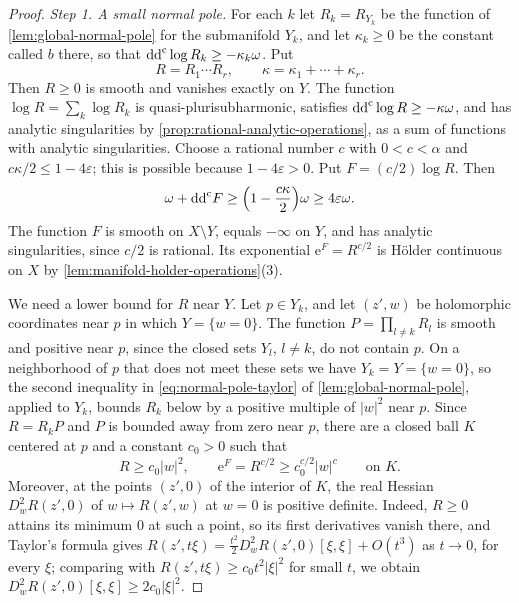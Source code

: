 \begin{proof}
\emph{Step 1. A small normal pole.} For each $k$ let $R_k=R_{Y_k}$ be the function of \cref{lem:global-normal-pole} for the submanifold $Y_k$, and let $\kappa_k\geq0$ be the constant called $b$ there, so that $\mathrm{dd}^{\mathrm{c}}\log R_k\geq-\kappa_k\omega$. Put
\[
 R=R_1\cdots R_r,\qquad\kappa=\kappa_1+\cdots+\kappa_r.
\]
Then $R\geq0$ is smooth and vanishes exactly on $Y$. The function $\log R=\sum_k\log R_k$ is quasi-plurisubharmonic, satisfies $\mathrm{dd}^{\mathrm{c}}\log R\geq-\kappa\omega$, and has analytic singularities by \cref{prop:rational-analytic-operations}, as a sum of functions with analytic singularities. Choose a rational number $c$ with $0<c<\alpha$ and $c\kappa/2\leq1-4\varepsilon$; this is possible because $1-4\varepsilon>0$. Put $F=(c/2)\log R$. Then
\[
 \omega+\mathrm{dd}^{\mathrm{c}} F\geq\Bigl(1-\frac{c\kappa}2\Bigr)\omega\geq4\varepsilon\omega.
\]
The function $F$ is smooth on $X\setminus Y$, equals $-\infty$ on $Y$, and has analytic singularities, since $c/2$ is rational. Its exponential $\mathrm e^F=R^{c/2}$ is H\"older continuous on $X$ by \cref{lem:manifold-holder-operations}(3).

We need a lower bound for $R$ near $Y$. Let $p\in Y_k$, and let $(z',w)$ be holomorphic coordinates near $p$ in which $Y=\{w=0\}$. The function $P=\prod_{l\neq k}R_l$ is smooth and positive near $p$, since the closed sets $Y_l$, $l\neq k$, do not contain $p$. On a neighborhood of $p$ that does not meet these sets we have $Y_k=Y=\{w=0\}$, so the second inequality in \eqref{eq:normal-pole-taylor} of \cref{lem:global-normal-pole}, applied to $Y_k$, bounds $R_k$ below by a positive multiple of $|w|^2$ near $p$. Since $R=R_kP$ and $P$ is bounded away from zero near $p$, there are a closed ball $K$ centered at $p$ and a constant $c_0>0$ such that
\begin{equation}\label{eq:normal-exponential-lower-bound}
 R\geq c_0|w|^2,\qquad \mathrm e^F=R^{c/2}\geq c_0^{c/2}|w|^c\qquad\text{on }K.
\end{equation}
Moreover, at the points $(z',0)$ of the interior of $K$, the real Hessian $D_w^2R(z',0)$ of $w\mapsto R(z',w)$ at $w=0$ is positive definite. Indeed, $R\geq0$ attains its minimum $0$ at such a point, so its first derivatives vanish there, and Taylor's formula gives $R(z',t\xi)=\frac{t^2}2D_w^2R(z',0)[\xi,\xi]+O(t^3)$ as $t\to0$, for every $\xi$; comparing with $R(z',t\xi)\geq c_0t^2|\xi|^2$ for small $t$, we obtain $D_w^2R(z',0)[\xi,\xi]\geq2c_0|\xi|^2$.


\end{proof}
